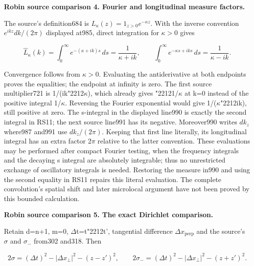 \documentclass[
  11pt,
]{article}
\begin{document}
\textbf{Robin source comparison 4. Fourier and longitudinal measure
factors.}

The source's definition684 is \ensuremath{L_\kappa(z)=1_{z>0}e^{-\kappa z}}.
With the inverse convention \ensuremath{e^{ikz}dk/(2\pi)} displayed at985, direct
integration for \(\kappa >0\) gives

\[
 \widehat L_\kappa(k)=\int_0^\infty e^{-(\kappa+ik)s}\,ds
                         =\frac1{\kappa+ik},\qquad
 \int_0^\infty e^{-\kappa s+iks}\,ds=\frac1{\kappa-ik}.
 \tag{RS11}
\]

Convergence follows from \(\kappa >0\). Evaluating the antiderivative at
both endpoints proves the equalities; the endpoint at infinity is zero.
The first source multiplier721 is 1/(ik{\ReaderSymbols\char"2212}\ensuremath{\kappa}), which already gives {\ReaderSymbols\char"2212}1/\ensuremath{\kappa} at
k=0 instead of the positive integral 1/\ensuremath{\kappa}. Reversing the Fourier
exponential would give 1/(\ensuremath{\kappa}{\ReaderSymbols\char"2212}ik), still positive at zero. The s-integral
in the displayed line990 is exactly the second integral in RS11; the
next source line991 has its negative. Moreover990 writes \ensuremath{dk_z} where987
and991 use \ensuremath{dk_z/(2\pi)}. Keeping that first line literally, its
longitudinal integral has an extra factor 2\ensuremath{\pi} relative to the latter
convention. These evaluations may be performed after compact Fourier
testing, when the frequency integrals and the decaying s integral are
absolutely integrable; thus no unrestricted exchange of oscillatory
integrals is needed. Restoring the measure in990 and using the second
equality in RS11 repairs this literal evaluation. The complete
convolution's spatial shift and later microlocal argument have not been
proved by this bounded calculation.

\textbf{Robin source comparison 5. The exact Dirichlet comparison.}

Retain d=n+1, m=0, \ensuremath{\Delta}t=t{\ReaderSymbols\char"2212}t', tangential difference \ensuremath{\Delta x_{\mathrm{perp}}} and the
source's \ensuremath{\sigma} and \ensuremath{\sigma_-} from302 and318. Then

\[
 2\sigma=(\Delta t)^2-|\Delta x_\perp|^2-(z-z')^2,\qquad
 2\sigma_-=(\Delta t)^2-|\Delta x_\perp|^2-(z+z')^2.
 \tag{RS12}
\]
\end{document}
